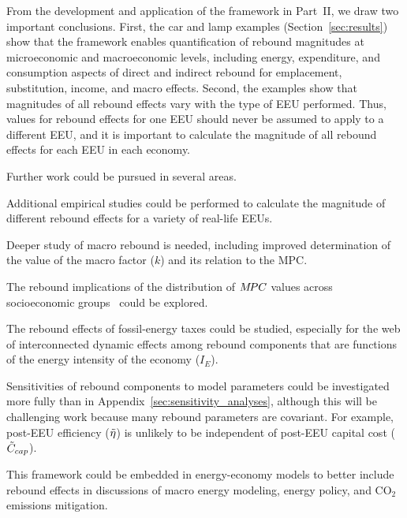 \documentclass[12pt]{article}\usepackage[]{graphicx}\usepackage[]{xcolor}
\begin{document}
From the development and application of the framework in Part~II, 
we draw two important conclusions.
First, the car and lamp examples (Section~\ref{sec:results}) show that
        the framework enables
        quantification of rebound magnitudes at microeconomic and macroeconomic levels, including 
        energy, expenditure, and consumption aspects of 
        direct and indirect rebound 
        for emplacement, substitution, income, and macro effects.
Second, the examples show that magnitudes of all rebound effects
        vary with the type of EEU performed.
Thus, values for rebound effects  
for one EEU should never be assumed to apply to a different EEU, and
it is important to calculate the magnitude of all rebound effects 
for each EEU in each economy.

Further work could be pursued in several areas. 
%
\begin{enumerate*}[label={(\roman*)}]
	
  \item Additional empirical studies could be performed
        to calculate the magnitude of different 
        rebound effects for a variety of real-life EEUs.

  \item Deeper study of macro rebound is needed, including improved determination 
        of the value of the macro factor ($k$) and its relation to the MPC.
        
  \item The rebound implications of the distribution of $M\!PC$ values 
        across socioeconomic groups~\citep{Carroll2017}
        could be explored.
        
  \item The rebound effects of fossil-energy taxes 
        could be studied,
        especially for the web of interconnected dynamic effects
        among rebound components that are functions
        of the energy intensity of the economy ($I_E$).
        
  \item Sensitivities of rebound components to model parameters
        could be investigated more fully 
        than in Appendix~\ref{sec:sensitivity_analyses}, although
        this will be challenging work because
        many rebound parameters are covariant.
        For example, post-EEU efficiency ($\tilde{\eta}$)
        is unlikely to be independent of post-EEU capital cost ($\tilde{C}_{cap}$).

  \item This framework could be embedded 
        in energy-economy models to better include rebound effects 
        in discussions of macro energy modeling, energy policy, and 
        CO$_2$ emissions mitigation.
        
\end{enumerate*}
\end{document}
